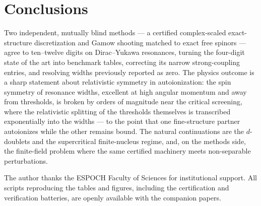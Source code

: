 \documentclass[aps,pra,twocolumn,superscriptaddress,floatfix,longbibliography]{revtex4-2}
\begin{document}
\section{Conclusions}

Two independent, mutually blind methods --- a certified complex-scaled
exact-structure discretization and Gamow shooting matched to exact free
spinors --- agree to ten--twelve digits on Dirac--Yukawa resonances,
turning the four-digit state of the art into benchmark tables,
correcting its narrow strong-coupling entries, and resolving widths
previously reported as zero. The physics outcome is a sharp statement
about relativistic symmetry in autoionization: the spin symmetry of
resonance widths, excellent at high angular momentum and away from
thresholds, is broken by orders of magnitude near the critical
screening, where the relativistic splitting of the thresholds
themselves is transcribed exponentially into the widths --- to the
point that one fine-structure partner autoionizes while the other
remains bound. The natural continuations are the $d$-doublets and the
supercritical finite-nucleus regime, and, on the methods side, the
finite-field problem where the same certified machinery meets
non-separable perturbations.

\begin{acknowledgments}
The author thanks the ESPOCH Faculty of Sciences for institutional
support. All scripts reproducing the tables and figures, including the
certification and verification batteries, are openly available with the
companion papers.
\end{acknowledgments}


\end{document}
